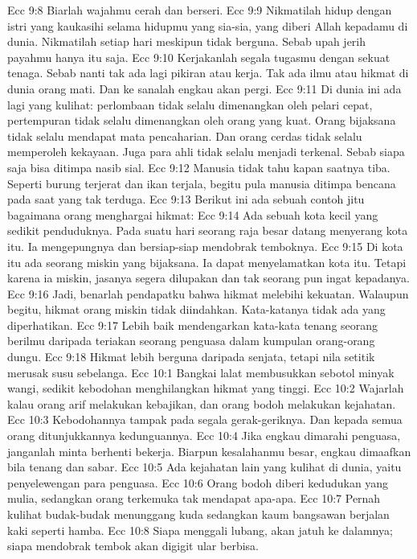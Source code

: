 Ecc 9:8  Biarlah wajahmu cerah dan berseri.
Ecc 9:9  Nikmatilah hidup dengan istri yang kaukasihi selama hidupmu yang sia-sia, yang diberi Allah kepadamu di dunia. Nikmatilah setiap hari meskipun tidak berguna. Sebab upah jerih payahmu hanya itu saja.
Ecc 9:10  Kerjakanlah segala tugasmu dengan sekuat tenaga. Sebab nanti tak ada lagi pikiran atau kerja. Tak ada ilmu atau hikmat di dunia orang mati. Dan ke sanalah engkau akan pergi.
Ecc 9:11  Di dunia ini ada lagi yang kulihat: perlombaan tidak selalu dimenangkan oleh pelari cepat, pertempuran tidak selalu dimenangkan oleh orang yang kuat. Orang bijaksana tidak selalu mendapat mata pencaharian. Dan orang cerdas tidak selalu memperoleh kekayaan. Juga para ahli tidak selalu menjadi terkenal. Sebab siapa saja bisa ditimpa nasib sial.
Ecc 9:12  Manusia tidak tahu kapan saatnya tiba. Seperti burung terjerat dan ikan terjala, begitu pula manusia ditimpa bencana pada saat yang tak terduga.
Ecc 9:13  Berikut ini ada sebuah contoh jitu bagaimana orang menghargai hikmat:
Ecc 9:14  Ada sebuah kota kecil yang sedikit penduduknya. Pada suatu hari seorang raja besar datang menyerang kota itu. Ia mengepungnya dan bersiap-siap mendobrak temboknya.
Ecc 9:15  Di kota itu ada seorang miskin yang bijaksana. Ia dapat menyelamatkan kota itu. Tetapi karena ia miskin, jasanya segera dilupakan dan tak seorang pun ingat kepadanya.
Ecc 9:16  Jadi, benarlah pendapatku bahwa hikmat melebihi kekuatan. Walaupun begitu, hikmat orang miskin tidak diindahkan. Kata-katanya tidak ada yang diperhatikan.
Ecc 9:17  Lebih baik mendengarkan kata-kata tenang seorang berilmu daripada teriakan seorang penguasa dalam kumpulan orang-orang dungu.
Ecc 9:18  Hikmat lebih berguna daripada senjata, tetapi nila setitik merusak susu sebelanga.
Ecc 10:1  Bangkai lalat membusukkan sebotol minyak wangi, sedikit kebodohan menghilangkan hikmat yang tinggi.
Ecc 10:2  Wajarlah kalau orang arif melakukan kebajikan, dan orang bodoh melakukan kejahatan.
Ecc 10:3  Kebodohannya tampak pada segala gerak-geriknya. Dan kepada semua orang ditunjukkannya kedunguannya.
Ecc 10:4  Jika engkau dimarahi penguasa, janganlah minta berhenti bekerja. Biarpun kesalahanmu besar, engkau dimaafkan bila tenang dan sabar.
Ecc 10:5  Ada kejahatan lain yang kulihat di dunia, yaitu penyelewengan para penguasa.
Ecc 10:6  Orang bodoh diberi kedudukan yang mulia, sedangkan orang terkemuka tak mendapat apa-apa.
Ecc 10:7  Pernah kulihat budak-budak menunggang kuda sedangkan kaum bangsawan berjalan kaki seperti hamba.
Ecc 10:8  Siapa menggali lubang, akan jatuh ke dalamnya; siapa mendobrak tembok akan digigit ular berbisa.
